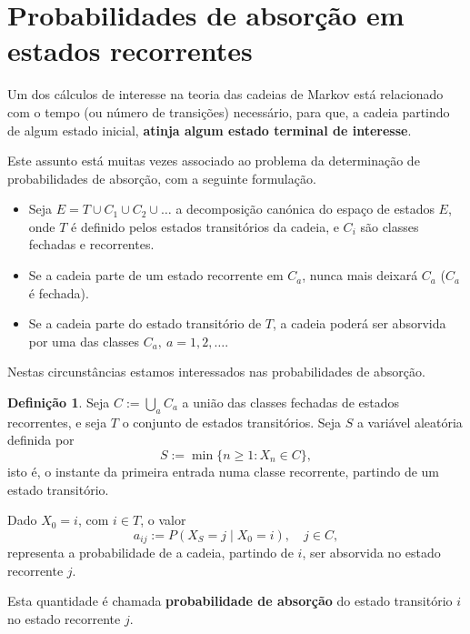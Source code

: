 \documentclass[
  11pt,
  a4paper,
]{book}
\theoremstyle{definition}
\newtheorem{definition}{Definição}[chapter]
\theoremstyle{definition}
\theoremstyle{definition}
\theoremstyle{definition}
\theoremstyle{remark}
\begin{document}
\section{Probabilidades de absorção em estados recorrentes}\label{probabilidades-de-absorcao-em-estados-recorrentes}

Um dos cálculos de interesse na teoria das cadeias de Markov está relacionado com o tempo (ou número de transições) necessário, para que, a cadeia partindo de algum estado inicial, \textbf{atinja algum estado terminal de interesse}.

Este assunto está muitas vezes associado ao problema da determinação de probabilidades de absorção, com a seguinte formulação.

\begin{itemize}
\item
  Seja \(E=T \cup C_1 \cup C_2 \cup \dots\) a decomposição canónica do espaço de estados \(E\), onde \(T\) é definido pelos estados transitórios da cadeia, e \(C_i\) são classes fechadas e recorrentes.
\item
  Se a cadeia parte de um estado recorrente em \(C_a\), nunca mais deixará \(C_a\) (\(C_a\) é fechada).
\item
  Se a cadeia parte do estado transitório de \(T\), a cadeia poderá ser absorvida por uma das classes \(C_a, ~a=1,2,\dots.\)
\end{itemize}

Nestas circunstâncias estamos interessados nas probabilidades de absorção.

\begin{definition}
Seja \(C := \bigcup\limits_a C_a\) a união das classes fechadas de estados recorrentes, e seja \(T\) o conjunto de estados transitórios. Seja \(S\) a variável aleatória definida por
\[
S := \min\{n \geq 1 : X_n \in C\},
\]
isto é, o instante da primeira entrada numa classe recorrente, partindo de um estado transitório.

Dado \(X_0 = i\), com \(i \in T\), o valor
\[
a_{ij} := P(X_S = j \mid X_0 = i), \quad j \in C,
\]
representa a probabilidade de a cadeia, partindo de \(i\), ser absorvida no estado recorrente \(j\).

Esta quantidade é chamada \textbf{probabilidade de absorção} do estado transitório \(i\) no estado recorrente \(j\).
\end{definition}

\(\,\)
\end{document}
